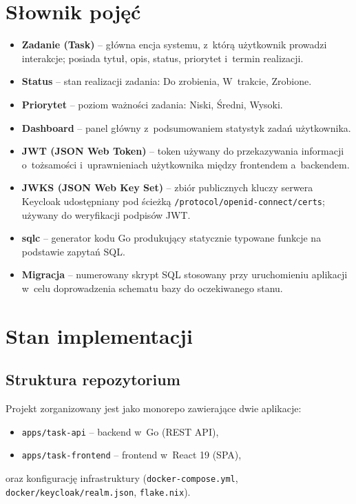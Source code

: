 \documentclass[12pt, a4paper, oneside]{article}
\begin{document}
\section{Słownik pojęć}

\begin{itemize}
  \item \textbf{Zadanie (Task)} -- główna encja systemu, z~którą użytkownik prowadzi interakcje; posiada tytuł, opis, status, priorytet i~termin realizacji.
  \item \textbf{Status} -- stan realizacji zadania: Do zrobienia, W~trakcie, Zrobione.
  \item \textbf{Priorytet} -- poziom ważności zadania: Niski, Średni, Wysoki.
  \item \textbf{Dashboard} -- panel główny z~podsumowaniem statystyk zadań użytkownika.
  \item \textbf{JWT (JSON Web Token)} -- token używany do przekazywania informacji o~tożsamości i~uprawnieniach użytkownika między frontendem a~backendem.
  \item \textbf{JWKS (JSON Web Key Set)} -- zbiór publicznych kluczy serwera Keycloak udostępniany pod ścieżką \texttt{/protocol/openid-connect/certs}; używany do weryfikacji podpisów JWT.
  \item \textbf{sqlc} -- generator kodu Go produkujący statycznie typowane funkcje na podstawie zapytań SQL.
  \item \textbf{Migracja} -- numerowany skrypt SQL stosowany przy uruchomieniu aplikacji w~celu doprowadzenia schematu bazy do oczekiwanego stanu.
\end{itemize}

\section{Stan implementacji}\label{sec:stan-impl}

\subsection{Struktura repozytorium}
Projekt zorganizowany jest jako monorepo zawierające dwie aplikacje:
\begin{itemize}
  \item \texttt{apps/task-api} -- backend w~Go (REST API),
  \item \texttt{apps/task-frontend} -- frontend w~React 19 (SPA),
\end{itemize}
oraz konfigurację infrastruktury (\texttt{docker-compose.yml}, \texttt{docker/keycloak/realm.json}, \texttt{flake.nix}).
\end{document}
